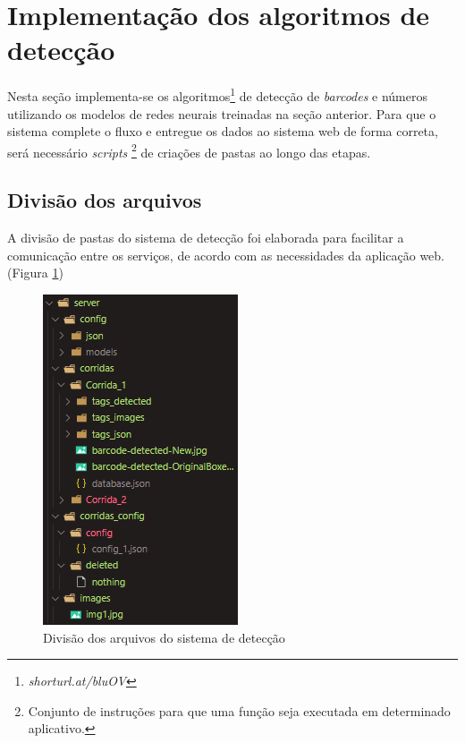 \section{Implementação dos algoritmos de detecção}

Nesta seção implementa-se os algoritmos\footnote{\textit{shorturl.at/bluOV}} de detecção de \textit{barcodes} e números utilizando os modelos de redes neurais treinadas na seção anterior. Para que o sistema complete o fluxo e entregue os dados ao sistema web de forma correta, será necessário \textit{scripts} \footnote{Conjunto de instruções para que uma função seja executada em determinado aplicativo.} de criações de pastas ao longo das etapas.

\subsection*{Divisão dos arquivos}

A divisão de pastas do sistema de detecção foi elaborada para facilitar a comunicação entre os serviços, de acordo com as necessidades da aplicação web.(Figura \ref{fig:folderSystem})

\begin{figure}[H]
	\centering
	\includegraphics[width=0.4\linewidth]{figuras/MachineLearning/folderSystem.png}
	\caption{Divisão dos arquivos do sistema de detecção}
	\label{fig:folderSystem}
\end{figure}


